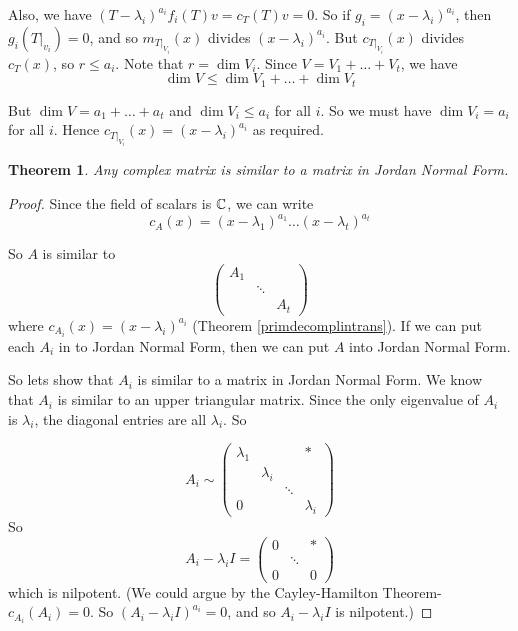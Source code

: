 \documentclass{article}
\newtheorem{theorem}{Theorem}
\theoremstyle{definition} \newtheorem*{definition}{Definition}
\newcommand{\ct}{c_T}
\begin{document}
Also, we have $(T-\lambda_i)^{a_i}f_i(T)v = c_T(T)v=0$. So if
$g_i = (x-\lambda_i)^{a_i}$, then $g_i(T|_{v_i})=0$, and so 
$m_{T|_{V_i}}(x)$ divides $(x-\lambda_i)^{a_i}$. But 
$c_{T|_{V_i}}(x)$ divides $\ct(x)$, so $r\le a_i$. Note that 
$r=\dim V_i$. Since $V=V_1+\dots+V_t$, we have
\[
  \dim V \le \dim V_1 + \dots + \dim V_t
\]

But $\dim V = a_1+ \dots + a_t$ and $\dim V_i \le a_i$ for all $i$.
So we must have $\dim V_i=a_i$ for all $i$. Hence $c_{T|_{V_i}}(x)=
(x-\lambda_i)^{a_i}$ as required.

\begin{theorem}
  Any complex matrix is similar to a matrix in Jordan Normal Form.
  \label{complexsimilarjnf}
\end{theorem}
\begin{proof}
  Since the field of scalars is $\mathbb{C}$, we can write
  \[
    c_A(x) = (x-\lambda_1)^{a_1}\dots(x-\lambda_t)^{a_t}
  \]

  So $A$ is similar to 
  \[
    \left( 
    \begin{matrix}
      A_1 &&\\
      &\ddots&\\
      &&A_t
    \end{matrix}
    \right)
  \]
  where $c_{A_i}(x)=(x-\lambda_i)^{a_i}$ 
  (Theorem \ref{primdecomplintrans}). If we can put each $A_i$ in to 
  Jordan Normal Form, then we can put $A$ into Jordan Normal Form.

  So lets show that $A_i$ is similar to a matrix in Jordan Normal Form.
  We know that $A_i$ is similar to an upper triangular matrix. Since 
  the only eigenvalue of $A_i$ is $\lambda_i$, the diagonal entries
  are all $\lambda_i$. So

  \[
    A_i \sim \left( 
    \begin{matrix}
      \lambda_1 &&&*\\
      &\lambda_i&&\\
      &&\ddots&\\
      0&&&\lambda_i
    \end{matrix}
    \right)
  \]
  So
  \[
    A_i -\lambda_i I  = \left( 
    \begin{matrix}
      0 &&*\\
      &\ddots&\\
      0&&0
    \end{matrix}
    \right)
  \]
  which is nilpotent. (We could argue by the Cayley-Hamilton Theorem-
  $c_{A_i}(A_i)=0$. So $(A_i-\lambda_i I)^{a_i}=0$, and so $
  A_i-\lambda_i I$ is nilpotent.)


\end{proof}
\end{document}
